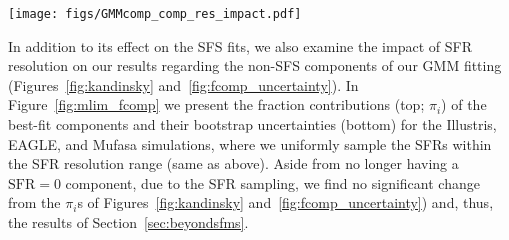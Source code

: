 \documentclass[preprint2,tighten]{aastex62}
\begin{document}
\begin{figure*}
\begin{center}
\texttt{[image: figs/GMMcomp\_comp\_res\_impact.pdf]}
\caption{Fractional contributions, $\pi_i$s, of the best-fit GMM components 
from our SFS fitting for our hydrodynamic simulations (Illustris, EAGLE, and 
{\sc Mufasa}) where we uniformly sample the $100\,\mathrm{Myr}$ SFRs within
the SFR resolution range --- $\mathrm{SFR}_i^{\prime} \in [\mathrm{SFR}_i, \mathrm{SFR}_i + 
\Delta_\mathrm{SFR}]$. In the bottom panels, we plot the corresponding bootstrap 
uncertainties. In comparison to Figures~\ref{fig:kandinsky} 
and~\ref{fig:fcomp_uncertainty}, we find SFR resolution has no 
significant impact on the qualitative results in Section~\ref{sec:beyondsfms}.} 
\label{fig:mlim_fcomp}
\end{center}
\end{figure*}

In addition to its effect on the SFS fits, we also examine the impact of 
SFR resolution on our results regarding the non-SFS components of our GMM 
fitting (Figures~\ref{fig:kandinsky} and~\ref{fig:fcomp_uncertainty}). In 
Figure~\ref{fig:mlim_fcomp} we present the fraction contributions (top; $\pi_i$) 
of the best-fit components and their bootstrap uncertainties (bottom) for 
the Illustris, EAGLE, and {\sc Mufasa} simulations, where we uniformly 
sample the SFRs within the SFR resolution range (same as above). Aside from 
no longer having a $\mathrm{SFR}{=}0$ component, due to the SFR sampling, we 
find no significant change from the $\pi_i$s of Figures~\ref{fig:kandinsky} 
and~\ref{fig:fcomp_uncertainty}) and, thus, the results of Section~\ref{sec:beyondsfms}. 



\end{document}
